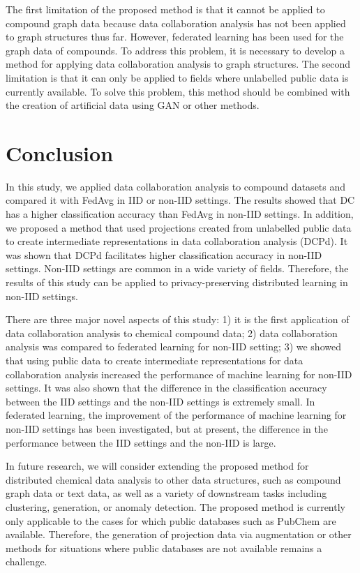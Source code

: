 \documentclass{article}
\begin{document}
The first limitation of the proposed method is that it cannot be applied to compound graph data because data collaboration analysis has not been applied to graph structures thus far. However, federated learning has been used for the graph data of compounds. To address this problem, it is necessary to develop a method for applying data collaboration analysis to graph structures. The second limitation is that it can only be applied to fields where unlabelled public data is currently available. To solve this problem, this method should be combined with the creation of artificial data using GAN or other methods.

\section{Conclusion}
\label{sec:sample1}
In this study, we applied data collaboration analysis to compound datasets and compared it with FedAvg in IID or non-IID settings. The results showed that DC has a higher classification accuracy than FedAvg in non-IID settings. In addition, we proposed a method that used projections created from unlabelled public data to create intermediate representations in data collaboration analysis (DCPd). It was shown that DCPd facilitates higher classification accuracy in non-IID settings. Non-IID settings are common in a wide variety of fields. Therefore, the results of this study can be applied to privacy-preserving distributed learning in non-IID settings.

There are three major novel aspects of this study: 1) it is the first application of data collaboration analysis to chemical compound data; 2) data collaboration analysis was compared to federated learning for non-IID setting; 3) we showed that using public data to create intermediate representations for data collaboration analysis increased the performance of machine learning for non-IID settings. It was also shown that the difference in the classification accuracy between the IID settings and the non-IID settings is extremely small. In federated learning, the improvement of the performance of machine learning for non-IID settings has been investigated, but at present, the difference in the performance between the IID settings and the non-IID is large.

In future research, we will consider extending the proposed method for distributed chemical data analysis to other data structures, such as compound graph data or text data, as well as a variety of downstream tasks including clustering, generation, or anomaly detection. The proposed method is currently only applicable to the cases for which public databases such as PubChem are available. Therefore, the generation of projection data via augmentation or other methods for situations where public databases are not available remains a challenge.



\printbibliography
\end{document}
